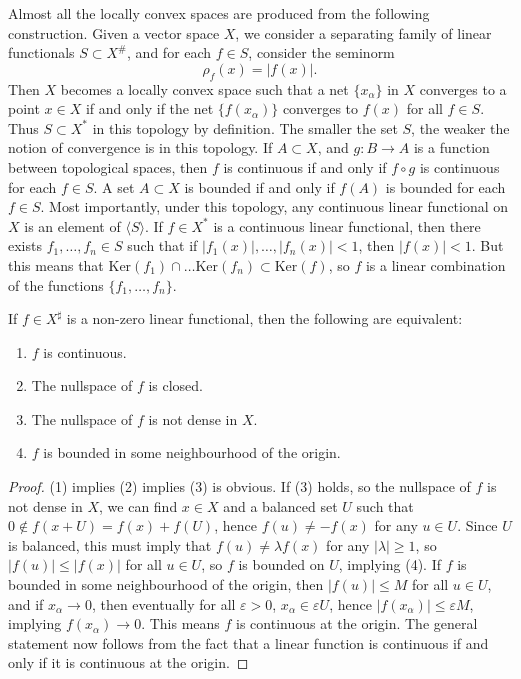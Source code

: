 \begin{remark}
    Almost all the locally convex spaces are produced from the following construction. Given a vector space $X$, we consider a separating family of linear functionals $S \subset X^\#$, and for each $f \in S$, consider the seminorm
    \[ \rho_f(x) = |f(x)|. \]
    Then $X$ becomes a locally convex space such that a net $\{ x_\alpha \}$ in $X$ converges to a point $x \in X$ if and only if the net $\{ f(x_\alpha) \}$ converges to $f(x)$ for all $f \in S$. Thus $S \subset X^*$ in this topology by definition. The smaller the set $S$, the weaker the notion of convergence is in this topology. If $A \subset X$, and $g: B \to A$ is a function between topological spaces, then $f$ is continuous if and only if $f \circ g$ is continuous for each $f \in S$. A set $A \subset X$ is bounded if and only if $f(A)$ is bounded for each $f \in S$. Most importantly, under this topology, any continuous linear functional on $X$ is an element of $\langle S \rangle$. If $f \in X^*$ is a continuous linear functional, then there exists $f_1,\dots,f_n \in S$ such that if $|f_1(x)|, \dots, |f_n(x)| < 1$, then $|f(x)| < 1$. But this means that $\text{Ker}(f_1) \cap \dots \text{Ker}(f_n) \subset \text{Ker}(f)$, so $f$ is a linear combination of the functions $\{ f_1, \dots, f_n \}$.
\end{remark}

\begin{theorem}
    If $f \in X^\sharp$ is a non-zero linear functional, then the following are equivalent:
    \begin{enumerate}
        \item $f$ is continuous.
        \item The nullspace of $f$ is closed.
        \item The nullspace of $f$ is not dense in $X$.
        \item $f$ is bounded in some neighbourhood of the origin.
    \end{enumerate}
\end{theorem}
\begin{proof}
    (1) implies (2) implies (3) is obvious. If (3) holds, so the nullspace of $f$ is not dense in $X$, we can find $x \in X$ and a balanced set $U$ such that $0 \not \in f(x + U) = f(x) + f(U)$, hence $f(u) \neq - f(x)$ for any $u \in U$. Since $U$ is balanced, this must imply that $f(u) \neq \lambda f(x)$ for any $|\lambda| \geq 1$, so $|f(u)| \leq |f(x)|$ for all $u \in U$, so $f$ is bounded on $U$, implying (4). If $f$ is bounded in some neighbourhood of the origin, then $|f(u)| \leq M$ for all $u \in U$, and if $x_\alpha \to 0$, then eventually for all $\varepsilon > 0$, $x_\alpha \in \varepsilon U$, hence $|f(x_\alpha)| \leq \varepsilon M$, implying $f(x_\alpha) \to 0$. This means $f$ is continuous at the origin. The general statement now follows from the fact that a linear function is continuous if and only if it is continuous at the origin.
\end{proof}

